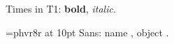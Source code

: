\documentclass{article}
\begin{document}
Times in T1: \textbf{bold}, \textit{italic}.

\newpage
\font\x=phvr8r at 10pt
{\x Sans: name \pdffontname\x, object \pdffontobjnum\x.}
\end{document}
